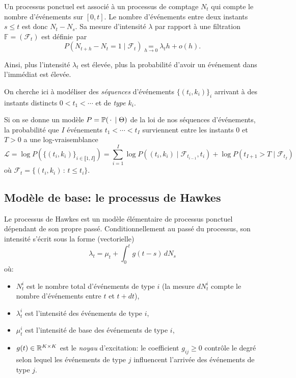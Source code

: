 \documentclass[../main.tex]{subfiles}
\begin{document}
Un processus ponctuel est associé à un processus de comptage $N_t$ qui compte le nombre d'événements sur $[0,t]$. Le nombre d'événements entre deux instants $s\leq t$ est donc $N_t - N_s$. Sa mesure d'intensité $\lambda$ par rapport à une filtration $\mathds F = (\mathcal{F}_t)$ est définie\footnotemark~par
\[
	P(N_{t+h} - N_t = 1\mid \mathcal{F}_t) \underset{h\to 0}{=} \lambda_th + o(h).
\]

Ainsi, plus l'intensité $\lambda_t$ est élevée, plus la probabilité d'avoir un événement dans l'immédiat est élevée.

On cherche ici à modéliser des \textit{séquences} d'événements ${\{(t_i,k_i)\}}_i$ arrivant à des instants distincts $0<t_1 < \cdots$ et de \textit{type} $k_i$.

Si on se donne un modèle $P = \mathbb{P}(\,\cdot\,\mid \Theta)$ de la loi de nos séquences d'événements, la probabilité que $I$ événements $t_1<\cdots<t_I$ surviennent entre les instants $0$ et $T > 0$ a une log-vraisemblance
\begin{equation}\label{eq:likelihood}
	\mathcal{L} =
	\log P(\{(t_i,k_i)\}_{i\in\llbracket 1,I\rrbracket}) =
	\sum_{i=1}^{I} \log P((t_i,k_i)\mid \mathcal{F}_{t_{i-1}}, t_i)
	+ \log P(t_{I+1}>T\mid \mathcal{F}_{t_{I}})
\end{equation}
où $\mathcal{F}_t = \{ (t_i,k_i)\,:\, t \leq t_i \}$.


\subsection{Modèle de base: le processus de Hawkes}

Le processus de Hawkes est un modèle élémentaire de processus ponctuel dépendant de son propre passé. Conditionnellement au passé du processus, son intensité s'écrit sous la forme (vectorielle)
\begin{equation}
\lambda_t = \mu_t + \int_0^t g(t-s)\,dN_s
\end{equation}
où:\begin{itemize}
	\item $N^i_t$ est le nombre total d'événements de type $i$ (la mesure $dN^i_t$ compte le nombre d'événements entre $t$ et $t+dt$),
	\item $\lambda_t^i$ est l'intensité des événements de type $i$,
	\item $\mu^i_t$ est l'intensité de base des événements de type $i$,
	\item $g(t) \in \mathbb{R}^{K\times K}$ est le \textit{noyau} d'excitation: le coefficient $g_{ij} \geq 0$ contrôle le degré selon lequel les événements de type $j$ influencent l'arrivée des événements de type $j$.
\end{itemize} 
\end{document}
